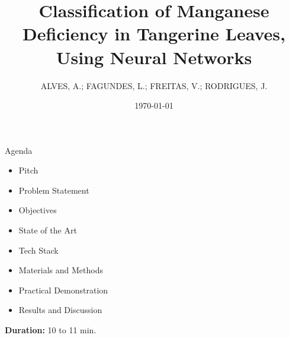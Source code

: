 \documentclass[aspectratio=169]{beamer}
\title{Classification of Manganese Deficiency in Tangerine Leaves, \\ Using Neural Networks}
\subtitle{}
\author[DSM]{ALVES, A.; FAGUNDES, L.; FREITAS, V.; RODRIGUES, J.}
\institute{Desenvolvimento de Software Multiplataforma\\FATEC Registro}
\date{\today}
\begin{document}
\begin{frame}
  \vspace{0.8cm}
  \begin{center}
    
    \vspace{0.4cm}
    
    {\normalsize\bfseries\inserttitle}\par
    
    \vspace{0.45cm}
    
    {\tiny\insertauthor}\par
    
    \vspace{0.1cm}
    
    {\small\textcolor{azulComplementar}{\insertsubtitle}}\par
    
    \vspace{0.5cm}
    
    
    \vspace{0.3cm}
    
    {\scriptsize\insertinstitute}\par
    
    \vspace{0.01cm}
    
    {\tiny\textcolor{azulComplementar}{\insertdate}}\par
  \end{center}
\end{frame}

\begin{frame}[b]{Agenda}
  \begin{itemize}
    \item Pitch
    \item Problem Statement
    \item Objectives
    \item State of the Art
    \item Tech Stack
    \item Materials and Methods
    \item Practical Demonstration
    \item Results and Discussion
  \end{itemize}
  
  \vfill
  
  \hfill{\scriptsize \textbf{Duration:} 10 to 11 min.}
\end{frame}
\end{document}
